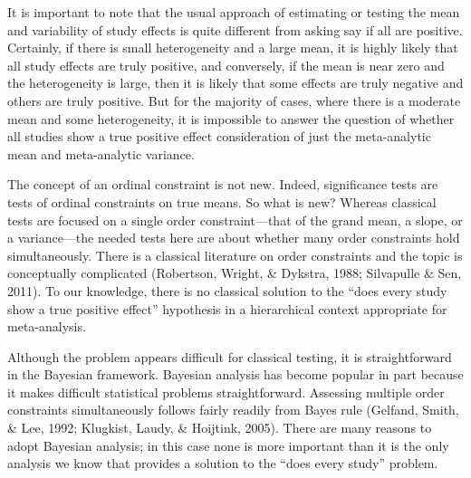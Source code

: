 \documentclass[english,man]{apa6}
\theoremstyle{definition}
\theoremstyle{definition}
\theoremstyle{remark}
\begin{document}
It is important to note that the usual approach of estimating or testing
the mean and variability of study effects is quite different from asking
say if all are positive. Certainly, if there is small heterogeneity and
a large mean, it is highly likely that all study effects are truly
positive, and conversely, if the mean is near zero and the heterogeneity
is large, then it is likely that some effects are truly negative and
others are truly positive. But for the majority of cases, where there is
a moderate mean and some heterogeneity, it is impossible to answer the
question of whether all studies show a true positive effect
consideration of just the meta-analytic mean and meta-analytic variance.

The concept of an ordinal constraint is not new. Indeed, significance
tests are tests of ordinal constraints on true means. So what is new?
Whereas classical tests are focused on a single order constraint---that
of the grand mean, a slope, or a variance---the needed tests here are
about whether many order constraints hold simultaneously. There is a
classical literature on order constraints and the topic is conceptually
complicated (Robertson, Wright, \& Dykstra, 1988; Silvapulle \& Sen,
2011). To our knowledge, there is no classical solution to the
\enquote{does every study show a true positive effect} hypothesis in a
hierarchical context appropriate for meta-analysis.

Although the problem appears difficult for classical testing, it is
straightforward in the Bayesian framework. Bayesian analysis has become
popular in part because it makes difficult statistical problems
straightforward. Assessing multiple order constraints simultaneously
follows fairly readily from Bayes rule (Gelfand, Smith, \& Lee, 1992;
Klugkist, Laudy, \& Hoijtink, 2005). There are many reasons to adopt
Bayesian analysis; in this case none is more important than it is the
only analysis we know that provides a solution to the \enquote{does
every study} problem.
\end{document}
